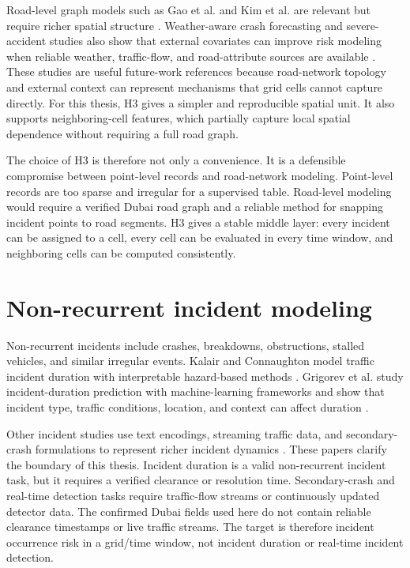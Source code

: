 Road-level graph models such as Gao et al. and Kim et al. are relevant but require richer spatial structure \cite{gao2023uncertainty,kim2024sstgcn}. Weather-aware crash forecasting and severe-accident studies also show that external covariates can improve risk modeling when reliable weather, traffic-flow, and road-attribute sources are available \cite{ogungbire2026weather,khulbe2019severe}. These studies are useful future-work references because road-network topology and external context can represent mechanisms that grid cells cannot capture directly. For this thesis, H3 gives a simpler and reproducible spatial unit. It also supports neighboring-cell features, which partially capture local spatial dependence without requiring a full road graph.

The choice of H3 is therefore not only a convenience. It is a defensible compromise between point-level records and road-network modeling. Point-level records are too sparse and irregular for a supervised table. Road-level modeling would require a verified Dubai road graph and a reliable method for snapping incident points to road segments. H3 gives a stable middle layer: every incident can be assigned to a cell, every cell can be evaluated in every time window, and neighboring cells can be computed consistently.

\section{Non-recurrent incident modeling}

Non-recurrent incidents include crashes, breakdowns, obstructions, stalled vehicles, and similar irregular events. Kalair and Connaughton model traffic incident duration with interpretable hazard-based methods \cite{kalair2021duration}. Grigorev et al. study incident-duration prediction with machine-learning frameworks and show that incident type, traffic conditions, location, and context can affect duration \cite{grigorev2022bilevel,grigorev2024sydney}.

Other incident studies use text encodings, streaming traffic data, and secondary-crash formulations to represent richer incident dynamics \cite{grigorev2022textencoding,parsa2019realtime,han2026secondary,chen2025secondarygan}. These papers clarify the boundary of this thesis. Incident duration is a valid non-recurrent incident task, but it requires a verified clearance or resolution time. Secondary-crash and real-time detection tasks require traffic-flow streams or continuously updated detector data. The confirmed Dubai fields used here do not contain reliable clearance timestamps or live traffic streams. The target is therefore incident occurrence risk in a grid/time window, not incident duration or real-time incident detection.

